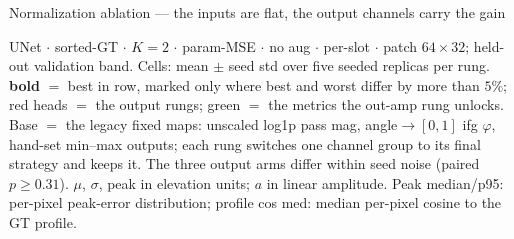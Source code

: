 \begin{frame}{Normalization ablation --- the inputs are flat, the output channels carry the gain}
  \parbox{0.86\textwidth}{\tiny\color{soft} UNet $\cdot$ sorted-GT $\cdot$ $K{=}2$ $\cdot$ param-MSE $\cdot$ no aug $\cdot$ per-slot $\cdot$ patch $64{\times}32$; held-out validation band. Cells: mean $\pm$ seed std over five seeded replicas per rung. \textbf{bold} $=$ best in row, marked only where best and worst differ by more than $5\%$; \textcolor{accent}{red heads} $=$ the output rungs; \textcolor{good}{green} $=$ the metrics the out-amp rung unlocks. Base $=$ the legacy fixed maps: unscaled log1p pass mag, angle${\to}[0,1]$ ifg $\varphi$, hand-set min--max outputs; each rung switches one channel group to its final strategy and keeps it. The three output arms differ within seed noise (paired $p \geq 0.31$). $\mu$, $\sigma$, peak in elevation units; $a$ in linear amplitude. Peak median/p95: per-pixel peak-error distribution; profile cos med: median per-pixel cosine to the GT profile.\par}


\end{frame}

